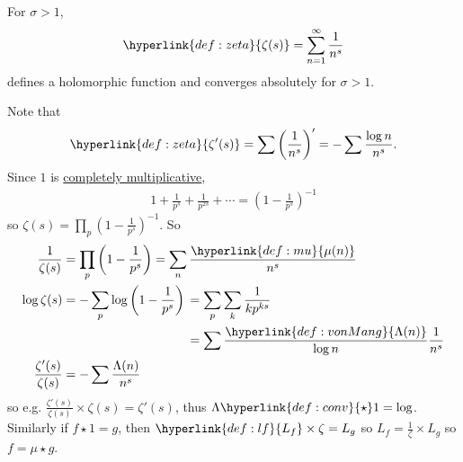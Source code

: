 \documentclass{article}
\newcommand{\1}{\mathbbm{1}}
\begin{document}
\begin{defi}
  For $\sigma > 1$,
  \begin{equation*}
  \hyperlink{def:zeta}{\zeta(s)} = \sum_{n = 1}^\infty \frac{1}{n^s}
  \end{equation*}
  defines a holomorphic function and converges absolutely for $\sigma > 1$.
\end{defi}
Note that
\begin{equation*}\hyperlink{def:zeta}{\zeta'(s)} = \sum \left(\frac{1}{n^s}\right)' = - \sum \frac{\log n}{n^s}.\end{equation*}
Since \hyperlink{def:1}{$1$} is \hyperlink{def:multi}{completely multiplicative},
\begin{align*}
  1 + \frac{1}{p^s} + \frac{1}{p^{2s}} + \dotsb = \left(1 - \frac{1}{p^s}\right)^{-1}
\end{align*}
so $\zeta(s) = \prod_p (1 - \frac{1}{p^s})^{-1}$.
So
\begin{align*}
  \frac{1}{\zeta(s)} &= \prod_p \left(1 - \frac{1}{p^s}\right) = \sum_{n} \frac{\hyperlink{def:mu}{\mu(n)}}{n^s} \\
  \log \zeta(s) &= - \sum_p \log\left(1 - \frac{1}{p^s}\right)
  \begin{aligned}[t]
    &=\sum_p \sum_k \frac{1}{kp^{ks}} \\
    &= \sum \frac{\hyperlink{def:vonMang}{\Lambda(n)}}{\log n} \frac{1}{n^s}
  \end{aligned}\\
  \frac{\zeta'(s)}{\zeta(s)} &= - \sum \frac{\Lambda(n)}{n^s}
\end{align*}
so e.g. $\frac{\zeta'(s)}{\zeta(s)} \times \zeta(s) = \zeta'(s)$, thus $\Lambda \hyperlink{def:conv}{\star} 1 = \log$.
Similarly if $f \star 1 = g$, then $\hyperlink{def:lf}{L_f} \times \zeta = L_g$ so $L_f = \frac{1}{\zeta} \times L_g$ so $f = \mu \star g$.
\end{document}
